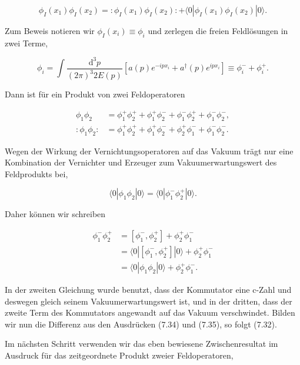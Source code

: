 \documentclass[10pt, letterpaper]{article}
\begin{document}
$$
\phi_{I}\left(x_{1}\right) \phi_{I}\left(x_{2}\right)=: \phi_{I}\left(x_{1}\right) \phi_{I}\left(x_{2}\right):+\langle 0| \phi_{I}\left(x_{1}\right) \phi_{I}\left(x_{2}\right)|0\rangle .
$$

Zum Beweis notieren wir $\phi_{I}\left(x_{i}\right) \equiv \phi_{i}$ und zerlegen die freien Feldlösungen in zwei Terme,

$$
\phi_{i}=\int \frac{\mathrm{d}^{3} p}{(2 \pi)^{3} 2 E(p)}\left[a(p) e^{-i p x_{i}}+a^{\dagger}(p) e^{i p x_{i}}\right] \equiv \phi_{i}^{-}+\phi_{i}^{+} .
$$

Dann ist für ein Produkt von zwei Feldoperatoren

$$
\begin{aligned}
\phi_{1} \phi_{2} & =\phi_{1}^{+} \phi_{2}^{+}+\phi_{1}^{+} \phi_{2}^{-}+\phi_{1}^{-} \phi_{2}^{+}+\phi_{1}^{-} \phi_{2}^{-}, \\
: \phi_{1} \phi_{2}: & =\phi_{1}^{+} \phi_{2}^{+}+\phi_{1}^{+} \phi_{2}^{-}+\phi_{2}^{+} \phi_{1}^{-}+\phi_{1}^{-} \phi_{2}^{-} .
\end{aligned}
$$

Wegen der Wirkung der Vernichtungsoperatoren auf das Vakuum trägt nur eine Kombination der Vernichter und Erzeuger zum Vakuumerwartungswert des Feldprodukts bei,

$$
\langle 0| \phi_{1} \phi_{2}|0\rangle=\langle 0| \phi_{1}^{-} \phi_{2}^{+}|0\rangle .
$$

Daher können wir schreiben

$$
\begin{aligned}
\phi_{1}^{-} \phi_{2}^{+} & =\left[\phi_{1}^{-}, \phi_{2}^{+}\right]+\phi_{2}^{+} \phi_{1}^{-} \\
& =\langle 0|\left[\phi_{1}^{-}, \phi_{2}^{+}\right]|0\rangle+\phi_{2}^{+} \phi_{1}^{-} \\
& =\langle 0| \phi_{1} \phi_{2}|0\rangle+\phi_{2}^{+} \phi_{1}^{-} .
\end{aligned}
$$

In der zweiten Gleichung wurde benutzt, dass der Kommutator eine c-Zahl und deswegen gleich seinem Vakuumerwartungswert ist, und in der dritten, dass der zweite Term des Kommutators angewandt auf das Vakuum verschwindet. Bilden wir nun die Differenz aus den Ausdrücken (7.34) und (7.35), so folgt (7.32).

Im nächsten Schritt verwenden wir das eben bewiesene Zwischenresultat im Ausdruck für das zeitgeordnete Produkt zweier Feldoperatoren,
\end{document}
